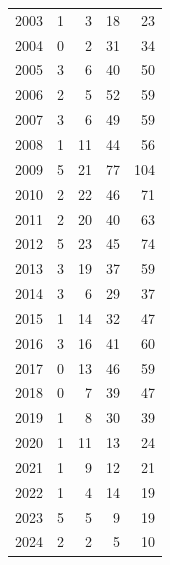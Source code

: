 \documentclass[
]{article}
\begin{document}
\begin{longtable}{rrrrr}
2003 & 1 & 3 & 18 & 23 \\ 
2004 & 0 & 2 & 31 & 34 \\ 
2005 & 3 & 6 & 40 & 50 \\ 
2006 & 2 & 5 & 52 & 59 \\ 
2007 & 3 & 6 & 49 & 59 \\ 
2008 & 1 & 11 & 44 & 56 \\ 
2009 & 5 & 21 & 77 & 104 \\ 
2010 & 2 & 22 & 46 & 71 \\ 
2011 & 2 & 20 & 40 & 63 \\ 
2012 & 5 & 23 & 45 & 74 \\ 
2013 & 3 & 19 & 37 & 59 \\ 
2014 & 3 & 6 & 29 & 37 \\ 
2015 & 1 & 14 & 32 & 47 \\ 
2016 & 3 & 16 & 41 & 60 \\ 
2017 & 0 & 13 & 46 & 59 \\ 
2018 & 0 & 7 & 39 & 47 \\ 
2019 & 1 & 8 & 30 & 39 \\ 
2020 & 1 & 11 & 13 & 24 \\ 
2021 & 1 & 9 & 12 & 21 \\ 
2022 & 1 & 4 & 14 & 19 \\ 
2023 & 5 & 5 & 9 & 19 \\ 
2024 & 2 & 2 & 5 & 10 \\ 
\bottomrule

\end{longtable}

\endgroup

\newpage{}

\begingroup
\fontsize{9.0pt}{11.0pt}\selectfont
\end{document}
